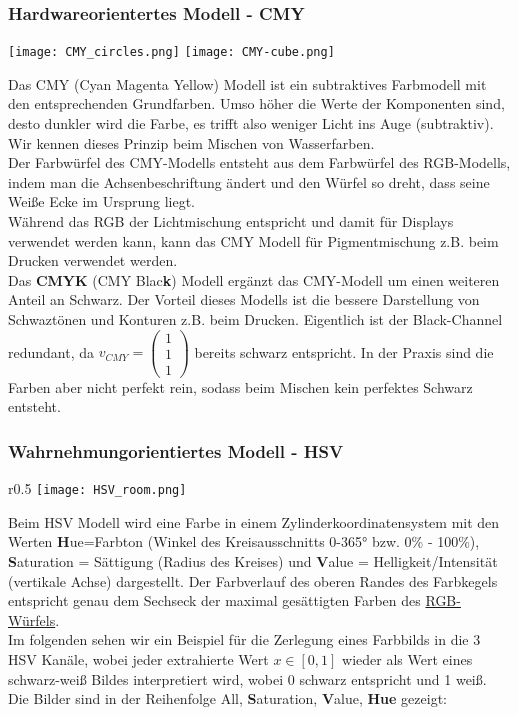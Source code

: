 \subsubsection{Hardwareorientertes Modell - CMY}

\texttt{[image: CMY\_circles.png]}
\texttt{[image: CMY-cube.png]}

Das CMY (Cyan Magenta Yellow) Modell ist ein subtraktives Farbmodell mit den entsprechenden Grundfarben. Umso höher die Werte der Komponenten sind, desto dunkler wird die Farbe, es trifft also weniger Licht ins Auge (subtraktiv). Wir kennen dieses Prinzip beim Mischen von Wasserfarben.\\
Der Farbwürfel des CMY-Modells entsteht aus dem Farbwürfel des RGB-Modells, indem man die Achsenbeschriftung ändert und den Würfel so dreht, dass seine Weiße Ecke im Ursprung liegt.\\
Während das RGB der Lichtmischung entspricht und damit für Displays verwendet werden kann, kann das CMY Modell für Pigmentmischung z.B. beim Drucken verwendet werden.\\
Das \textbf{CMYK} (CMY Blac\textbf{k}) Modell ergänzt das CMY-Modell um einen weiteren Anteil an Schwarz. Der Vorteil dieses Modells ist die bessere Darstellung von Schwaztönen und Konturen z.B. beim Drucken. Eigentlich ist der Black-Channel redundant, da ${v_{CMY}} = \left(\begin{smallmatrix}1 \\ 1 \\ 1 \end{smallmatrix}\right)$ bereits schwarz entspricht. In der Praxis sind die Farben aber nicht perfekt rein, sodass beim Mischen kein perfektes Schwarz entsteht.

\subsubsection{Wahrnehmungorientiertes Modell - HSV}

\begin{wrapfigure}{r}{0.5\textwidth}
    \centering
    \texttt{[image: HSV\_room.png]}
\end{wrapfigure}

Beim HSV Modell wird eine Farbe in einem Zylinderkoordinatensystem mit den Werten \textbf{H}ue=Farbton (Winkel des Kreisausschnitts 0-365° bzw. 0\% - 100\%), \textbf{S}aturation = Sättigung (Radius des Kreises) und \textbf{V}alue = Helligkeit/Intensität (vertikale Achse) dargestellt. Der Farbverlauf des oberen Randes des Farbkegels entspricht genau dem Sechseck der maximal gesättigten Farben des \hyperref[sec:RGB]{RGB-Würfels}.\\
Im folgenden sehen wir ein Beispiel für die Zerlegung eines Farbbilds in die 3 HSV Kanäle, wobei jeder extrahierte Wert $x \in [0, 1]$ wieder als Wert eines schwarz-weiß Bildes interpretiert wird, wobei 0 schwarz entspricht und 1 weiß.\\
Die Bilder sind in der Reihenfolge All, \textbf{S}aturation, \textbf{V}alue, \textbf{Hue} gezeigt:

